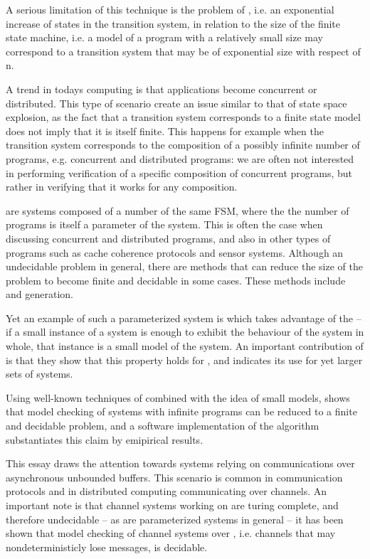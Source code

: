 A serious limitation of this technique is the problem of , i.e. an exponential increase of states in the transition system, in relation to the size of the finite state machine, i.e. a model of a program with a relatively small size may correspond to a transition system that may be of exponential size with respect of n.

A trend in todays computing is that applications become concurrent or distributed. This type of scenario create an issue similar to that of state space explosion, as the fact that a transition system corresponds to a finite state model does not imply that it is itself finite. This happens for example when the transition system corresponds to the composition of a possibly infinite number of programs, e.g. concurrent and distributed programs: we are often not interested in performing verification of a specific composition of concurrent programs, but rather in verifying that it works for any composition.

 are systems composed of a number of the same FSM, where the the number of programs is itself a parameter of the system. This is often the case when discussing concurrent and distributed programs, and also in other types of programs such as cache coherence protocols and sensor systems\cite{zuck2004}. Although an undecidable problem in general, there are methods that can reduce the size of the problem to become finite and decidable in some cases. These methods include \cite{counterabstraction} and  generation\cite{invinv}. 

Yet an example of such a parameterized system is \cite{parosh} which takes advantage of the  -- if a small instance of a system is enough to exhibit the behaviour of the system in whole, that instance is a small model of the system. An important contribution of \cite{parosh} is that they show that this property holds for , and indicates its use for yet larger sets of systems. 

Using well-known techniques of  combined with the idea of small models, \cite{parosh} shows that model checking of systems with infinite programs can be reduced to a finite and decidable problem, and a software implementation of the algorithm substantiates this claim by emipirical results.

This essay draws the attention towards systems relying on communications over asynchronous unbounded buffers. This scenario is common in communication protocols and in distributed computing communicating over channels. An important note is that channel systems working on  are turing complete, and therefore undecidable -- as are parameterized systems in general -- it has been shown that model checking of channel systems over , i.e. channels that may nondeterministicly lose messages, is decidable\cite{287591}\cite{gordon}.

